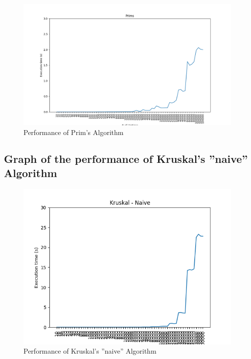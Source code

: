 	\begin{figure}[H]
		\hspace{-1cm}\includegraphics[width=19cm]{Img/Prims_Graph.png}
		\caption{Performance of Prim's Algorithm}
	\end{figure}

\pagebreak
\subsection{Graph of the performance of Kruskal's ''naive'' Algorithm}

	\begin{figure}[H]
		\hspace{-1cm}\includegraphics[width=19cm]{Img/Kruskal_Naive_Graph.png}
		\caption{Performance of Kruskal's ''naive'' Algorithm}
	\end{figure}

\pagebreak

